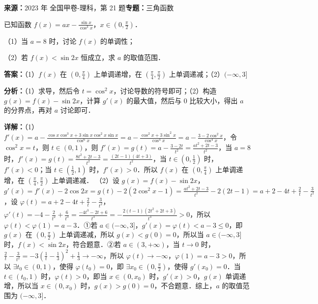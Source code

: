 \begin{question}[points=12]
\textbf{来源：}2023 年 全国甲卷-理科，第 21 题\quad \textbf{专题：}三角函数\par
已知函数 $f(x) = ax - \frac{\sin x}{\cos^3 x}$，$x \in \left(0, \frac{\pi}{2}\right)$．

（1）当 $a=8$ 时，讨论 $f(x)$ 的单调性；

（2）若 $f(x) < \sin 2x$ 恒成立，求 $a$ 的取值范围．
\begin{solution}
\textbf{答案：}（1）$f(x)$ 在 $(0,\frac{\pi}{4})$ 上单调递增，在 $(\frac{\pi}{4},\frac{\pi}{2})$ 上单调递减；（2）$(-\infty,3]$

\textbf{分析：}（1）求导，然后令 $t=\cos^2 x$，讨论导数的符号即可；（2）构造 $g(x)=f(x)-\sin 2x$，计算 $g'(x)$ 的最大值，然后与 0 比较大小，得出 $a$ 的分界点，再对 $a$ 讨论即可．

\textbf{详解：}（1）$f'(x) = a - \frac{\cos x \cos^3 x + 3\sin x \cos^2 x \sin x}{\cos^6 x} = a - \frac{\cos^2 x + 3\sin^2 x}{\cos^4 x} = a - \frac{3-2\cos^2 x}{\cos^4 x}$，令 $\cos^2 x = t$，则 $t\in(0,1)$，则 $f'(x) = g(t) = a - \frac{3-2t}{t^2} = \frac{at^2+2t-3}{t^2}$，当 $a=8$ 时，$f'(x) = g(t) = \frac{8t^2+2t-3}{t^2} = \frac{(2t-1)(4t+3)}{t^2}$，当 $t\in(0,\frac{1}{2})$ 时，$f'(x)<0$；当 $t\in(\frac{1}{2},1)$ 时，$f'(x)>0$．所以 $f(x)$ 在 $(0,\frac{\pi}{4})$ 上单调递增，在 $(\frac{\pi}{4},\frac{\pi}{2})$ 上单调递减．
（2）设 $g(x)=f(x)-\sin 2x$，$g'(x)=f'(x)-2\cos 2x = g(t) - 2(2\cos^2 x -1) = \frac{at^2+2t-3}{t^2} - 2(2t-1) = a+2 - 4t + \frac{2}{t} - \frac{3}{t^2}$，设 $\varphi(t)=a+2-4t+\frac{2}{t}-\frac{3}{t^2}$，$\varphi'(t)=-4-\frac{2}{t^2}+\frac{6}{t^3} = \frac{-4t^3-2t+6}{t^3} = -\frac{2(t-1)(2t^2+2t+3)}{t^3}>0$，所以 $\varphi(t)<\varphi(1)=a-3$．①若 $a\in(-\infty,3]$，$g'(x)=\varphi(t)<a-3\le0$，即 $g(x)$ 在 $(0,\frac{\pi}{2})$ 上单调递减，所以 $g(x)<g(0)=0$，所以当 $a\in(-\infty,3]$ 时，$f(x)<\sin 2x$，符合题意．②若 $a\in(3,+\infty)$，当 $t\to0$ 时，$\frac{2}{t}-\frac{3}{t^2} = -3\left(\frac{1}{t}-\frac{1}{3}\right)^2+\frac{1}{3} \to -\infty$，所以 $\varphi(t)\to -\infty$，$\varphi(1)=a-3>0$，所以 $\exists t_0\in(0,1)$，使得 $\varphi(t_0)=0$，即 $\exists x_0\in(0,\frac{\pi}{2})$，使得 $g'(x_0)=0$．当 $t\in(t_0,1)$ 时，$\varphi(t)>0$，即当 $x\in(0,x_0)$ 时，$g'(x)>0$，$g(x)$ 单调递增，所以当 $x\in(0,x_0)$ 时，$g(x)>g(0)=0$，不合题意．综上，$a$ 的取值范围为 $(-\infty,3]$．
\end{solution}
\end{question}

